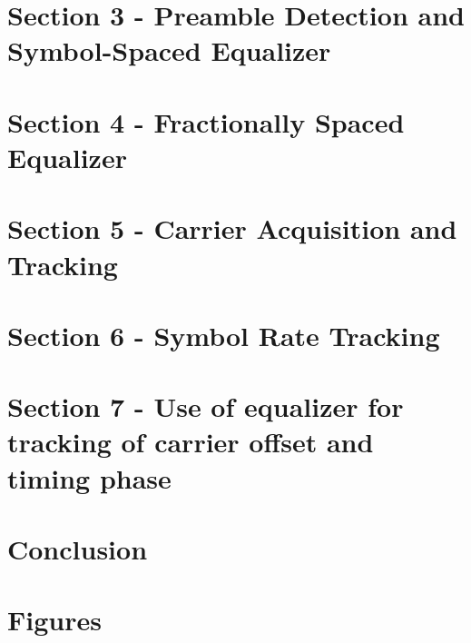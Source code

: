 \documentclass[10pt,a4paper]{report}
\begin{document}
\section{Section 3 - Preamble Detection and Symbol-Spaced Equalizer}

\vspace{-1em}
\section{Section 4 - Fractionally Spaced Equalizer}

\vspace{-1em}
\section{Section 5 - Carrier Acquisition and Tracking}

\vspace{-1em}
\section{Section 6 - Symbol Rate Tracking}

\vspace{-1em}
\section{Section 7 - Use of equalizer for tracking of carrier offset and timing phase}

\vspace{-1em}
\section{Conclusion}

\newpage
\section{Figures}
\end{document}
